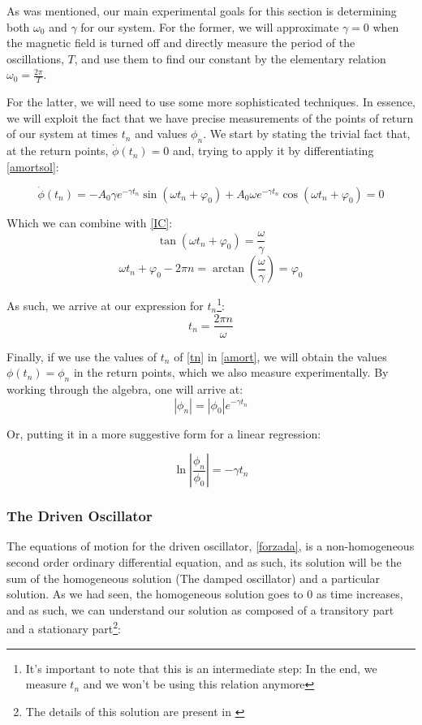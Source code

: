 \documentclass[a4paper,12pt]{article}
\begin{document}
As was mentioned, our main experimental goals for this section is determining both $\omega_0$ and $\gamma$ for our system. For the former, we will approximate $\gamma = 0$ when the magnetic field is turned off and directly measure the period of the oscillations, $T$, and use them to find our constant by the elementary relation$\omega_0 = \frac{2\pi}{T}$. 

For the latter, we will need to use some more sophisticated techniques. In essence, we will exploit the fact that we have precise measurements of the points of return of our system at times $t_n$ and values $\phi_n$. We start by stating the trivial fact that, at the return points, $\dot{\phi} (t_n)= 0$ and, trying to apply it by differentiating \eqref{amortsol}:

$$\dot{\phi} (t_n) = -A_0\gamma e^{-\gamma t_n}\sin(\omega t_n + \varphi_0) + A_0 \omega e^{-\gamma t_n}\cos(\omega t_n+ \varphi_0) = 0 $$

Which we can combine with \eqref{IC}:
$$\tan(\omega t_n + \varphi_0) = \frac{\omega}{\gamma}$$
$$\omega t_n + \varphi_0 - 2\pi n = \arctan(\frac{\omega}{\gamma}) = \varphi_0$$

As such, we arrive at our expression for $t_n$\footnote{It's important to note that this is an intermediate step: In the end, we measure $t_n$ and we won't be using this relation anymore}:
\begin{equation}
    \label{tn}
    t_n = \frac{2\pi n}{\omega}
\end{equation}

Finally, if we use the values of $t_n$ of \eqref{tn} in \eqref{amort}, we will obtain the values $\phi(t_n) = \phi_n$ in the return points, which we also measure experimentally. By working through the algebra, one will arrive at:
$$    \left| \phi_n\right| = \left|\phi_0\right| e^{-\gamma t_n} $$

Or, putting it in a more suggestive form for a linear regression:

\begin{equation}
    \label{regrgamma}
    \ln\left|\frac{\phi_n}{\phi_0} \right| = -\gamma t_n 
\end{equation}

\subsubsection{The Driven Oscillator}

The equations of motion for the driven oscillator, \eqref{forzada}, is a non-homogeneous second order ordinary differential equation, and as such, its solution will be the sum of the homogeneous solution (The damped oscillator) and a particular solution. As we had seen, the homogeneous solution goes to 0 as time increases, and as such, we can understand our solution as composed of a transitory part and a stationary part\footnote{The details of this solution are present in \cite[180]{Taylor}}:
\end{document}
